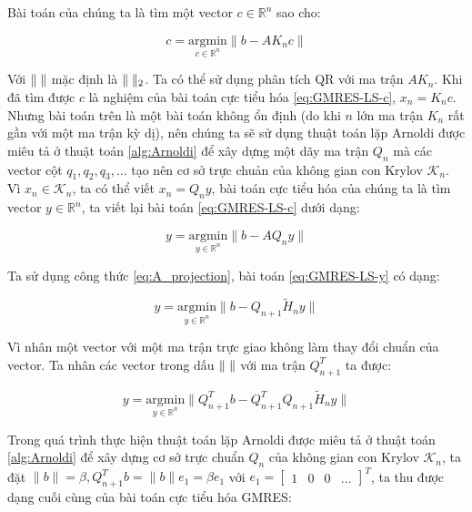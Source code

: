 \documentclass[14pt, a4paper]{article}
\numberwithin{equation}{section}
\numberwithin{algorithm}{section}
\numberwithin{figure}{section}
\numberwithin{dl}{section}
\numberwithin{md}{section}
\numberwithin{bd}{section}
\numberwithin{dn}{section}
\begin{document}
Bài toán của chúng ta là tìm một vector $c \in \mathbb{R}^n$ sao cho:

\begin{equation} \label{eq:GMRES-LS-c}
    c = \underset{c \in \mathbb{R}^{n}}{\mathrm{argmin}} \lVert b - AK_n c \rVert
\end{equation}

Với $\lVert \thickspace \rVert$ mặc định là $\lVert \thickspace \rVert_2$. Ta có thể sử dụng phân tích QR với ma trận $AK_n$. Khi đã tìm được $c$ là nghiệm của bài toán cực tiểu hóa \ref{eq:GMRES-LS-c}, $x_n=K_n c$. Nhưng bài toán trên là một bài toán không ổn định (do khi $n$ lớn ma trận $K_n$ rất gần với một ma trận kỳ dị), nên chúng ta sẽ sử dụng thuật toán lặp Arnoldi được miêu tả ở thuật toán \ref{alg:Arnoldi}
để xây dựng một dãy ma trận $Q_n$ mà các vector cột $q_1, q_2, q_3, \dots$ tạo nên cơ sở trực chuản của không gian con Krylov $\mathcal{K}_n$. Vì $x_n \in \mathcal{K}_n$, ta có thể viết $x_n = Q_n y$, bài toán cực tiểu hóa của chúng ta là tìm vector $y \in \mathbb{R}^n$, ta viết lại bài toán \ref{eq:GMRES-LS-c} dưới dạng:

\begin{equation} \label{eq:GMRES-LS-y}
    y = \underset{y \in \mathbb{R}^{n}}{\mathrm{argmin}} \lVert b - A Q_n y \rVert
\end{equation}

Ta sử dụng công thức \ref{eq:A_projection}, bài toán \ref{eq:GMRES-LS-y} có dạng:

\begin{equation}
    y = \underset{y \in \mathbb{R}^{n}}{\mathrm{argmin}} \lVert b - Q_{n+1} \widetilde{H}_n y \rVert
\end{equation}

Vì nhân một vector với một ma trận trực giao không làm thay đổi chuẩn của vector. Ta nhân các vector trong dấu $\lVert \thickspace \rVert$ với ma trận $Q_{n+1}^T$ ta được:

\begin{equation}
    y = \underset{y \in \mathbb{R}^{n}}{\mathrm{argmin}} \lVert Q_{n+1}^T b - Q_{n+1}^T Q_{n+1} \widetilde{H}_n y \rVert
\end{equation}

Trong quá trình thực hiện thuật toán lặp Arnoldi được miêu tả ở thuật toán \ref{alg:Arnoldi} để xây dựng cơ sở trực chuẩn $Q_n$ của không gian con Krylov $\mathcal{K}_n$, ta đặt $\lVert b \rVert = \beta, Q_{n+1}^T b=\lVert b \rVert e_1=\beta e_1$ với $e_1 = \begin{bmatrix}
    1 & 0 & 0 & \dots
\end{bmatrix}^T$, ta thu được dạng cuối cùng của bài toán cực tiểu hóa GMRES:
\end{document}

